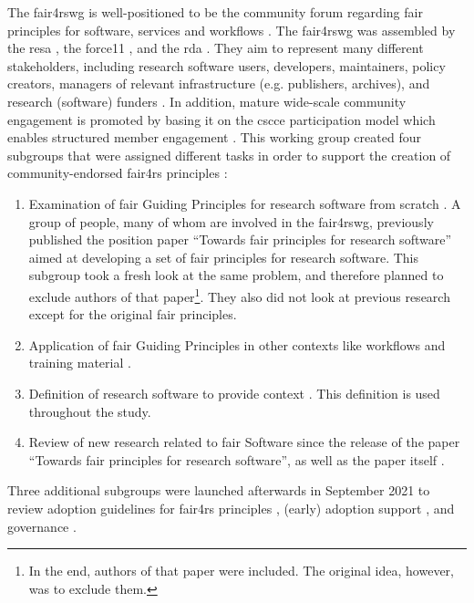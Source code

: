 The \acrfull{fair4rswg} is well-positioned to be the community forum regarding \acrshort{fair} principles for software, services and workflows \cite{noauthor_six_nodate}. The \acrshort{fair4rswg} was assembled by the \acrfull{resa} \cite{alliance_task_2020}, the \acrfull{force11} \cite{force11_members}, and the \acrfull{rda} \cite{RDABerman2020Research}. They aim to represent many different stakeholders, including research software users, developers, maintainers, policy creators, managers of relevant infrastructure (e.g. publishers, archives), and research (software) funders \cite{katz_fair4rs_2021}. In addition, mature wide-scale community engagement is promoted by basing it on the \acrfull{cscce} participation model which enables structured member engagement \cite{woodley_cscce_2020}. This working group created four subgroups that were assigned different tasks in order to support the creation of community-endorsed \acrshort{fair4rs} principles \cite{chue_hong_fair_2021, chue_hong_fair_2022}:
\begin{enumerate}
    \item Examination of \acrshort{fair} Guiding Principles for research software from scratch \cite{katz_fresh_2021}. A group of people, many of whom are involved in the \acrshort{fair4rswg}, previously published the position paper “Towards \acrshort{fair} principles for research software” \cite{lamprecht_towards_2020} aimed at developing a set of \acrshort{fair} principles for research software. This subgroup took a fresh look at the same problem, and therefore planned to exclude authors of that paper\footnote{In the end, authors of that paper were included. The original idea, however, was to exclude them.}. They also did not look at previous research except for the original \acrshort{fair} principles. 
    \item Application of \acrshort{fair} Guiding Principles in other contexts like workflows and training material \cite{kuzak_fair4rs_nodate}.
    \item Definition of research software to provide context \cite{gruenpeter_defining_2021}. This definition is used throughout the study.
    \item Review of new research related to \acrshort{fair} Software since the release of the paper “Towards \acrshort{fair} principles for research software”, as well as the paper itself \cite{lamprecht_towards_2020, wg_fair4rs_2021, chue_hong_what_2021}. 
\end{enumerate}
Three additional subgroups were launched afterwards in September 2021 \cite{chue_hong_fair4rs_2022} to review adoption guidelines for \acrshort{fair4rs} principles \cite{martinez_survey_2022}, (early) adoption support \cite{martinez-ortiz_fair4rs_2022}, and governance \cite{honeyman_subgroup_nodate}.  
